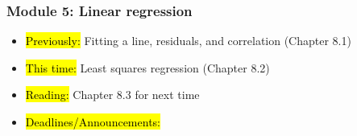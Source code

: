 
\begin{frame}
    \frametitle{Module 5: Linear regression}
    \begin{itemize}
        \item \hl{Previously: }Fitting a line, residuals, and correlation (Chapter 8.1)
        \item \hl{This time: }Least squares regression (Chapter 8.2)
        \item \hl{Reading: }Chapter 8.3 for next time
        \item \hl{Deadlines/Announcements: }
    \end{itemize}
    
\end{frame}